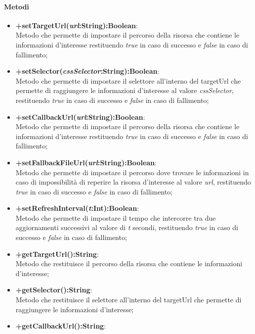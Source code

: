 	\paragraph{Metodi}
	\begin{itemize}
	\item \textbf{+setTargetUrl(\textit{url}:String):Boolean}:\\
		Metodo che permette di impostare il percorso della risorsa che contiene le informazioni d'interesse restituendo \textit{true} in caso di successo e \textit{false} in caso di fallimento;
	\item \textbf{+setSelector(\textit{cssSelector}:String):Boolean}:\\
		Metodo che permette di impostare il selettore all'interno del targetUrl che permette di raggiungere le informazioni d'interesse al valore \textit{cssSelector}, restituendo \textit{true} in caso di successo e \textit{false} in caso di fallimento;
	\item \textbf{+setCallbackUrl(\textit{url}:String):Boolean}:\\
		Metodo che permette di impostare il percorso della risorsa che contiene le informazioni d'interesse restituendo \textit{true} in caso di successo e \textit{false} in caso di fallimento;
	\item \textbf{+setFallbackFileUrl(\textit{url}:String):Boolean}:\\
		Metodo che permette di impostare il percorso dove trovare le informazioni in caso di impossibilità di reperire la risorsa d'interesse al valore \textit{url}, restituendo \textit{true} in caso di successo e \textit{false} in caso di fallimento;
	\item \textbf{+setRefreshInterval(\textit{t}:Int):Boolean}:\\
		Metodo che permette di impostare il tempo che intercorre tra due aggiornamenti successivi al valore di \textit{t} secondi, restituendo \textit{true} in caso di successo e \textit{false} in caso di fallimento;
	\item \textbf{+getTargetUrl():String}:\\
		Metodo che restituisce il percorso della risorsa che contiene le informazioni d'interesse;
	\item \textbf{+getSelector():String}:\\
		Metodo che restituisce il selettore all'interno del targetUrl che permette di raggiungere le informazioni d'interesse;			
	\item \textbf{+getCallbackUrl():String}:\\

\end{itemize}

